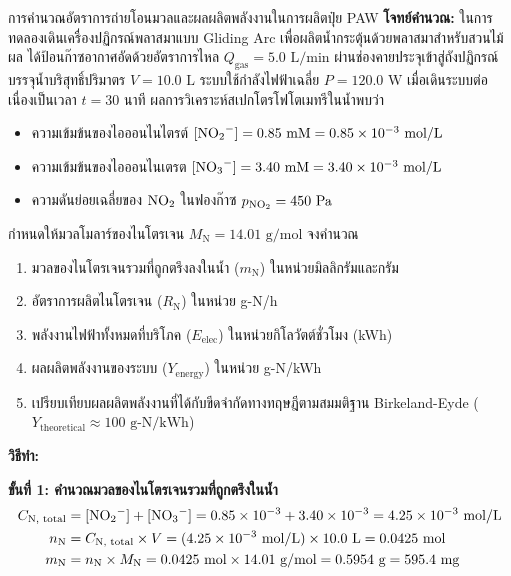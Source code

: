 \begin{examplebox}{การคำนวณอัตราการถ่ายโอนมวลและผลผลิตพลังงานในการผลิตปุ๋ย PAW}
\textbf{โจทย์คำนวณ:} ในการทดลองเดินเครื่องปฏิกรณ์พลาสมาแบบ Gliding Arc เพื่อผลิตน้ำกระตุ้นด้วยพลาสมาสำหรับสวนไม้ผล ได้ป้อนก๊าซอากาศอัดด้วยอัตราการไหล $Q_{\text{gas}} = 5.0 \text{ L/min}$ ผ่านช่องคายประจุเข้าสู่ถังปฏิกรณ์บรรจุน้ำบริสุทธิ์ปริมาตร $V = 10.0 \text{ L}$ ระบบใช้กำลังไฟฟ้าเฉลี่ย $P = 120.0 \text{ W}$ เมื่อเดินระบบต่อเนื่องเป็นเวลา $t = 30 \text{ นาที}$ ผลการวิเคราะห์สเปกโตรโฟโตเมทรีในน้ำพบว่า
\begin{itemize}
    \item ความเข้มข้นของไอออนไนไตรต์ $[\ce{NO2-}] = 0.85 \text{ mM} = 0.85 \times 10^{-3} \text{ mol/L}$
    \item ความเข้มข้นของไอออนไนเตรต $[\ce{NO3-}] = 3.40 \text{ mM} = 3.40 \times 10^{-3} \text{ mol/L}$
    \item ความดันย่อยเฉลี่ยของ $\ce{NO2}$ ในฟองก๊าซ $p_{\ce{NO2}} = 450 \text{ Pa}$
\end{itemize}
กำหนดให้มวลโมลาร์ของไนโตรเจน $M_{\text{N}} = 14.01 \text{ g/mol}$ จงคำนวณ
\begin{enumerate}
    \item มวลของไนโตรเจนรวมที่ถูกตรึงลงในน้ำ ($m_{\text{N}}$) ในหน่วยมิลลิกรัมและกรัม
    \item อัตราการผลิตไนโตรเจน ($R_{\text{N}}$) ในหน่วย g-N/h
    \item พลังงานไฟฟ้าทั้งหมดที่บริโภค ($E_{\text{elec}}$) ในหน่วยกิโลวัตต์ชั่วโมง (kWh)
    \item ผลผลิตพลังงานของระบบ ($Y_{\text{energy}}$) ในหน่วย g-N/kWh
    \item เปรียบเทียบผลผลิตพลังงานที่ได้กับขีดจำกัดทางทฤษฎีตามสมมติฐาน Birkeland-Eyde ($Y_{\text{theoretical}} \approx 100 \text{ g-N/kWh}$)
\end{enumerate}

\vspace{6pt}
\textbf{วิธีทำ:}

\textbf{ขั้นที่ 1: คำนวณมวลของไนโตรเจนรวมที่ถูกตรึงในน้ำ}
\begin{align*}
    C_{\text{N, total}} &= [\ce{NO2-}] + [\ce{NO3-}] = 0.85 \times 10^{-3} + 3.40 \times 10^{-3} = 4.25 \times 10^{-3} \text{ mol/L} \\
    n_{\text{N}} &= C_{\text{N, total}} \times V = (4.25 \times 10^{-3} \text{ mol/L}) \times 10.0 \text{ L} = 0.0425 \text{ mol} \\
    m_{\text{N}} &= n_{\text{N}} \times M_{\text{N}} = 0.0425 \text{ mol} \times 14.01 \text{ g/mol} = 0.5954 \text{ g} = 595.4 \text{ mg}
\end{align*}


\end{examplebox}
